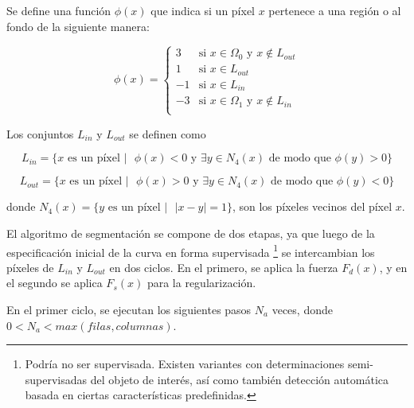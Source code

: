 Se define una función $\phi(x)$ que indica si un píxel $x$ pertenece a una
región o al fondo de la siguiente manera:

\begin{equation}
\phi(x) =
\left\{
    \begin{array}{ll}
        3  & \mbox{si } x \in \Omega_{0} \mbox{  y  } x \notin L_{out} \\
        1  & \mbox{si } x \in L_{out}\\
        -1  & \mbox{si } x \in L_{in}\\
        -3 & \mbox{si } x \in \Omega_{1} \mbox{  y  } x \notin L_{in} \\
    \end{array}
\right.
\end{equation}

Los conjuntos $L_{in}$ y $L_{out}$ se definen como

\begin{equation}
    L_{in} = \{ x \mbox{ es un píxel } \vert \mbox{    }  \phi(x) < 0 \mbox{ y } \exists y \in N_{4}(x) \mbox{ de modo que } \phi(y) > 0 \}
\end{equation}

\begin{equation}
    L_{out} = \{ x \mbox{ es un píxel } \vert \mbox{    } \phi(x) > 0 \mbox{ y } \exists y \in N_{4}(x) \mbox{ de modo que } \phi(y) < 0 \}
\end{equation}

donde $N_{4}(x) = \{ y \mbox{ es un píxel } \vert \mbox{   } |x-y| = 1 \}$, son
los píxeles vecinos del píxel $x$.

El algoritmo de segmentación se compone de dos etapas, ya que luego de la
especificación inicial de la curva en forma supervisada
\footnote{Podría no ser supervisada. Existen variantes con determinaciones
semi-supervisadas del objeto de interés, así como también detección automática
basada en ciertas características predefinidas.}
se intercambian los píxeles de $L_{in}$ y $L_{out}$ en dos ciclos. En el
primero, se aplica la fuerza $F_{d}(x)$, y en el segundo se aplica $F_{s}(x)$
para la regularización.

En el primer ciclo, se ejecutan los siguientes pasos $N_{a}$ veces, donde $ 0 <
N_{a} < max(filas, columnas)$.

